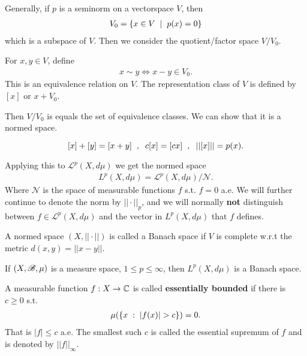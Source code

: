 Generally, if $p$ is a seminorm on a vectorspace $V$, then
 \begin{align}
    V_0 = \left\{x\in V\hspace{2mm}|\hspace{2mm} p(x)=0 \right\}
\end{align}
which is a subspace of $V$. Then we consider the quotient/factor space $V/V_0.$

\begin{definition}
    For $x,y\in V$, define \begin{align}
        x\sim y \iff x-y\in V_0.
    \end{align}
    This is an equivalence relation on $V$. The representation class of $V$ is defined by $[x]$ or $x+V_0$.
\end{definition}

Then $V/V_0$ is equals the set of equivalence classes. We can show that it is a normed space. 

$$[x]+[y]=[x+y]\hspace{2mm},\hspace{2mm} c[x]=[cx]\hspace{2mm},\hspace{2mm} ||[x]||=p(x). $$

Applying this to $\mathcal L^p(X,d\mu)$ we get the normed space \begin{align}
    L^p(X,d\mu) = \mathcal L ^p(X,d\mu)/\mathcal N.
\end{align}
Where $\mathcal N$ is the space of measurable functions $f$ s.t. $f=0$ a.e. We will further continue to denote the norm by $||\cdot||_p$, and we will normally \textbf{not} distinguish between $f\in \mathcal L^p(X,d\mu)$ and the vector in 
$L^p(X,d\mu)$ that $f$ defines.

\begin{definition}
    A normed space $(X,||\cdot||)$ is called a Banach space if $V$ is complete w.r.t the metric $d(x,y)=||x-y||$.
\end{definition}

\begin{theorem}
    If $(X,\mathscr{B},\mu)$ is a measure space, $1\leq p\leq \infty$, then $L^p(X,d\mu)$ is a Banach space.
\end{theorem}

\begin{definition}
    A measurable function $f:X\rightarrow \mathbb{C}$ is called \textbf{essentially bounded} if there is $c\geq 0$ s.t. 
    \begin{align}
    \mu(\left\{ x\omm:\omm |f(x)|>c \right\})=0.    
    \end{align}
    That is $|f|\leq c$ a.e. The smallest such $c$ is called the essential supremum of $f$ and is denoted by $||f||_\infty.$
\end{definition}

